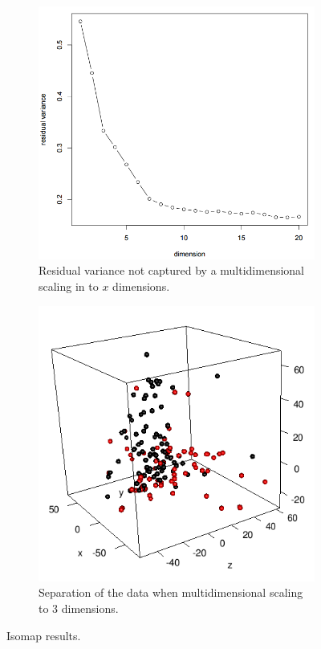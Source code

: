 \documentclass[]{article}
\begin{document}
  \begin{figure}[H]
    \centering
    \begin{subfigure}{.52\textwidth}
      \centering
      \includegraphics[width=1\linewidth]{iso_resid_var.png}
      \caption{Residual variance not captured by a multidimensional scaling in to $x$ dimensions.}
    \end{subfigure}
    \begin{subfigure}{.47\textwidth}
      \centering
      \includegraphics[width=1\linewidth]{isos3d.png}
      \caption{Separation of the data when multidimensional scaling to 3 dimensions.}
    \end{subfigure}
    \caption{Isomap results.}
    \label{fig:isos}
  \end{figure}
\end{document}
